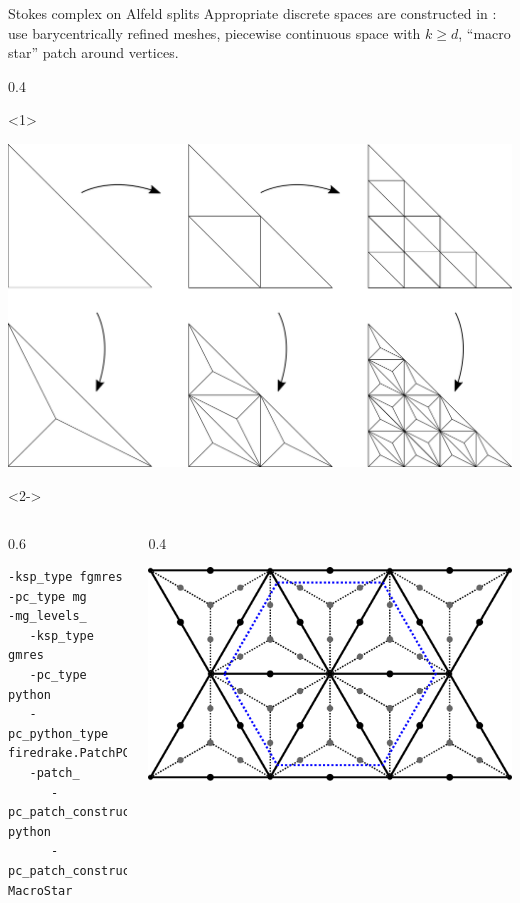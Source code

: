 \documentclass[presentation,aspectratio=43, 10pt]{beamer}
\begin{document}
\begin{frame}[fragile,t]
\begin{block}{Stokes complex on Alfeld splits}
    Appropriate discrete spaces are constructed in \textcite{Fu:2018}: use
    barycentrically refined meshes, piecewise continuous space with $k
    \ge d$, ``macro star'' patch around vertices.
  \end{block}
  \begin{overlayarea}{\textwidth}{0.4\textheight}
    \begin{onlyenv}<1>
      \begin{center}
        \includegraphics[height=0.4\textheight]{mh_bary_5}
      \end{center}
    \end{onlyenv}
    \begin{onlyenv}<2->
  \begin{columns}
    \begin{column}{0.6\textwidth}
\begin{verbatim}
-ksp_type fgmres
-pc_type mg
-mg_levels_
   -ksp_type gmres
   -pc_type python
   -pc_python_type firedrake.PatchPC
   -patch_
      -pc_patch_construct_type python
      -pc_patch_construct_python_type MacroStar
\end{verbatim}
    \end{column}
    \begin{column}{0.4\textwidth}
      \vspace{-1.5em}
      \begin{center}
        \includegraphics[width=\textwidth]{macrostar}

\end{center}
\end{column}
\end{columns}
\end{onlyenv}
\end{overlayarea}
\end{frame}
\end{document}
